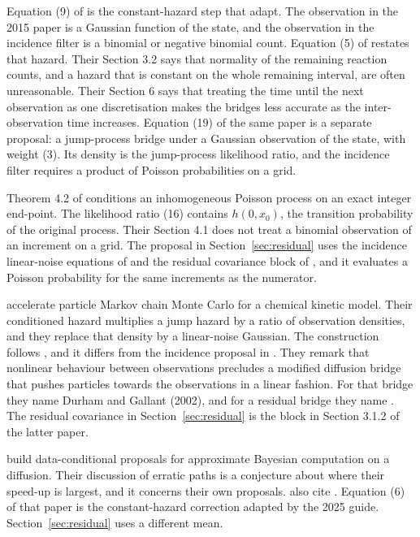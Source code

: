 Equation (9) of \citet{golightly2015} is the constant-hazard step that \citet{whitaker2025} adapt. The observation in the 2015 paper is a Gaussian function of the state, and the observation in the incidence filter is a binomial or negative binomial count. Equation (5) of \citet{golightly2019} restates that hazard. Their Section 3.2 says that normality of the remaining reaction counts, and a hazard that is constant on the whole remaining interval, are often unreasonable. Their Section 6 says that treating the time until the next observation as one discretisation makes the bridges less accurate as the inter-observation time increases. Equation (19) of the same paper is a separate proposal: a jump-process bridge under a Gaussian observation of the state, with weight (3). Its density is the jump-process likelihood ratio, and the incidence filter requires a product of Poisson probabilities on a grid.

Theorem 4.2 of \citet{corstanje2023} conditions an inhomogeneous Poisson process on an exact integer end-point. The likelihood ratio (16) contains \(h(0,x_0)\), the transition probability of the original process. Their Section 4.1 does not treat a binomial observation of an increment on a grid. The proposal in Section~\ref{sec:residual} uses the incidence linear-noise equations of \citet{golightly2023} and the residual covariance block of \citet[Section 3.1.2]{whitaker2017}, and it evaluates a Poisson probability for the same increments as the numerator.

\citet{lowe2023} accelerate particle Markov chain Monte Carlo for a chemical kinetic model. Their conditioned hazard multiplies a jump hazard by a ratio of observation densities, and they replace that density by a linear-noise Gaussian. The construction follows \citet{golightly2019}, and it differs from the incidence proposal in \citet{whitaker2025}. They remark that nonlinear behaviour between observations precludes a modified diffusion bridge that pushes particles towards the observations in a linear fashion. For that bridge they name Durham and Gallant (2002), and for a residual bridge they name \citet{whitaker2017}. The residual covariance in Section~\ref{sec:residual} is the block in Section 3.1.2 of the latter paper.

\citet{jovanovski2024} build data-conditional proposals for approximate Bayesian computation on a diffusion. Their discussion of erratic paths is a conjecture about where their speed-up is largest, and it concerns their own proposals. \citet[pp.~2--3]{whitaker2025} also cite \citet{golightly2018}. Equation (6) of that paper is the constant-hazard correction adapted by the 2025 guide. Section~\ref{sec:residual} uses a different mean.
